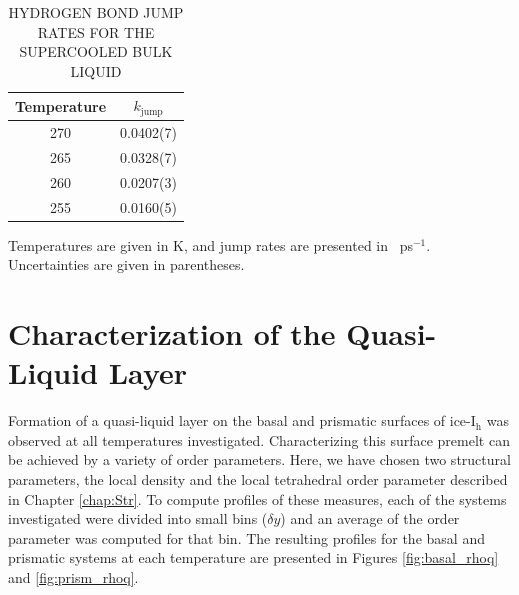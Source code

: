\begin{table}[h] \centering \caption{HYDROGEN BOND JUMP RATES FOR THE
    SUPERCOOLED BULK LIQUID\label{tab:bulkJump}}
\begin{threeparttable}
\begin{tabular}{cc}
\hline
\hline
 Temperature & $k_\mathrm{jump}$ \\
\hline
270 & 0.0402(7) \\
265 & 0.0328(7) \\
260 & 0.0207(3)  \\
255 & 0.0160(5) \\
\hline
\hline
\end{tabular}
\begin{tablenotes}
      \small
    \item Temperatures are given in K, and jump rates are presented in
      ~ps$^{-1}$. Uncertainties are given in parentheses.
\end{tablenotes}
\end{threeparttable}
\end{table}


\section{Characterization of the Quasi-Liquid Layer}
Formation of a quasi-liquid layer on the basal and prismatic surfaces
of ice-I$_\mathrm{h}$ was observed at all temperatures
investigated. Characterizing this surface premelt can be achieved by a
variety of order parameters. Here, we have chosen two structural
parameters, the local density and the local tetrahedral order
parameter described in Chapter \ref{chap:Str}. To compute profiles of
these measures, each of the systems investigated were divided into
small bins ($\delta y$) and an average of the order parameter was
computed for that bin. The resulting profiles for the basal and
prismatic systems at each temperature are presented in Figures
\ref{fig:basal_rhoq} and \ref{fig:prism_rhoq}.

